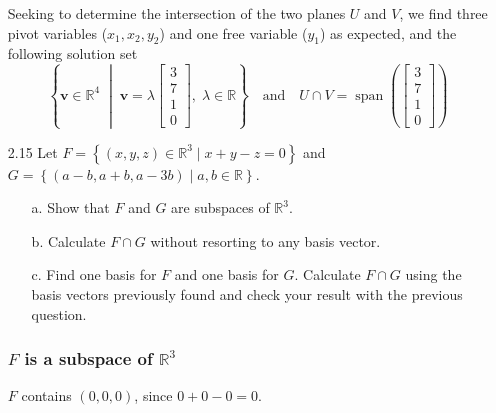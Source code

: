 \documentclass[11pt]{article}
\newcommand{\R}{\mathbb{R}}
\DeclareMathOperator{\Span}{span}
\theoremstyle{definition}
\theoremstyle{plain}
\theoremstyle{remark}
\newcounter{subsubsubsection}[subsubsection]
\begin{document}
\begin{enumerate}
          Seeking to determine the intersection of the two planes \(U\) and \(V\), we find three pivot variables (\(x_1,
          x_2, y_2\)) and one free variable (\(y_1\)) as expected, and the following solution set
          \[
              \left \{
              \mathbf{v} \in \R^4 \;\middle |\; \mathbf{v} = \lambda
              \begin{bmatrix}
                  3 \\ 7 \\ 1 \\ 0
              \end{bmatrix}
              ,\;
              \lambda \in \R
              \right \}
              \quad
              \text{and}
              \quad
              U \cap V =
              \Span \left (
              \begin{bmatrix}
                      3 \\ 7 \\ 1 \\ 0
                  \end{bmatrix}
              \right )
          \]

          \pagebreak

    \item[2.15] Let \(F = \left \{ (x, y, z) \in \R^3 \mid x + y - z = 0 \right \}\) and
          \(G = \left \{ (a - b, a + b, a - 3b) \mid a, b \in \R \right \}\).

          \begin{enumerate}
              \item[a.] Show that \(F\) and \(G\) are subspaces of \(\R^3\).

              \item[b.] Calculate \(F \cap G\) without resorting to any basis vector.

              \item[c.] Find one basis for \(F\) and one basis for \(G\).  Calculate \(F \cap G\) using the basis vectors
                    previously found and check your result with the previous question.
          \end{enumerate}

          \subsubsection*{\(F\) is a subspace of \(\R^3\)}


          \(F\) contains \((0, 0, 0)\), since \(0 + 0 - 0 = 0\).


\end{enumerate}
\end{document}
